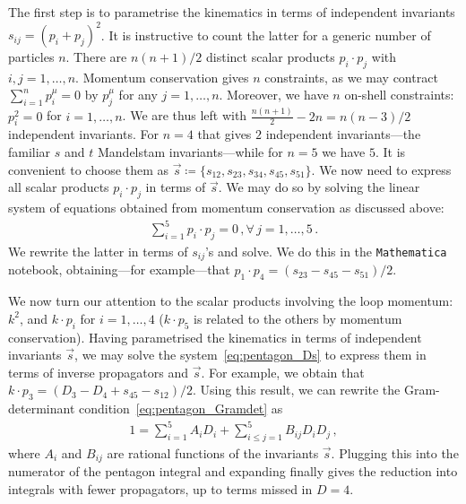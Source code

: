 \begin{enumerate}[a)]
The first step is to parametrise the kinematics in terms of independent invariants $s_{ij} = (p_i+p_j)^2$. It is instructive to count the latter for a generic number of particles $n$.
There are $n(n+1)/2$ distinct scalar products $p_i\cdot p_j$ with $i,j=1,\ldots,n$. Momentum conservation gives $n$ constraints, as we may contract $\sum_{i=1}^n p_i^{\mu} = 0$ by $p_j^{\mu}$ for any $j=1,\ldots,n$. Moreover, we have 
$n$ on-shell constraints: $p_i^2=0$ for $i=1,\ldots,n$. We are thus left with $\frac{n(n+1)}{2} -2 n = n (n-3)/2 $ independent invariants. For $n=4$ that gives $2$ independent invariants---the familiar $s$ and $t$ Mandelstam invariants---while for $n=5$ we have $5$. It is convenient to choose them as $\vec{s} \coloneqq \{s_{12},s_{23},s_{34},s_{45},s_{51}\}$. We now need to express all scalar products $p_i\cdot p_j$ in terms of $\vec{s}$. We may do so by solving the linear system of equations obtained from momentum conservation as discussed above:
\begin{align}
\sum_{i=1}^5 p_i \cdot p_j = 0 \,, \forall \, j=1,\ldots, 5\,.
\end{align}
We rewrite the latter in terms of $s_{ij}$'s and solve. We do this in the \texttt{Mathematica} notebook, obtaining---for example---that
$p_1 \cdot p_4 = (s_{23} - s_{45} - s_{51})/2$.

We now turn our attention to the scalar products involving the loop momentum: $k^2$, and $k\cdot p_i$ for $i=1,\ldots,4$ ($k\cdot p_5$ is related to the others by momentum conservation). Having parametrised the kinematics in terms of independent invariants $\vec{s}$, we may solve the system~\eqref{eq:pentagon_Ds} to express them in terms of inverse propagators and $\vec{s}$.
For example, we obtain that $k \cdot p_3 = (D_3 - D_4 + s_{45} -s_{12})/2$.
Using this result, we can rewrite the Gram-determinant condition~\eqref{eq:pentagon_Gramdet} as
\begin{align}
1 = \sum_{i=1}^5 A_i D_i + \sum_{i\le j=1}^5 B_{ij} D_i D_j \,,
\end{align}
where $A_i$ and $B_{ij}$ are rational functions of the invariants $\vec{s}$. Plugging this into the numerator of the pentagon integral and expanding finally gives the reduction into integrals with fewer propagators, up to terms missed in $D=4$.

\end{enumerate}



